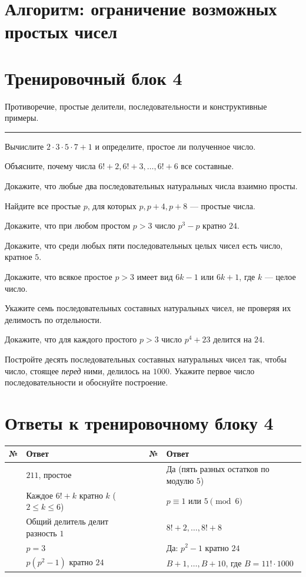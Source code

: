 \documentclass[11pt,a4paper]{article}
\newcommand{\task}[2]{\par\needspace{2\baselineskip}\noindent\makebox[8mm][l]{\color{navy}\bfseries #1.}#2\par\vspace{2mm}}
\newcommand{\training}[2]{\clearpage\section*{Тренировочный блок #1}\textcolor{muted}{#2}\par\vspace{3mm}\rule{\linewidth}{.4pt}\vspace{2mm}}
\newcommand{\answers}[2]{\clearpage\section*{Ответы к тренировочному блоку #1}\vspace{3mm}#2}
\newcommand{\anstable}[1]{\begin{center}\small\begin{tabularx}{\linewidth}{>{\centering\arraybackslash}p{9mm}X>{\centering\arraybackslash}p{9mm}X}\toprule\textbf{№}&\textbf{Ответ}&\textbf{№}&\textbf{Ответ}\\\midrule #1\\\bottomrule\end{tabularx}\end{center}}
\newcommand{\schemetitle}[1]{\clearpage\thispagestyle{fancy}\section*{Алгоритм: #1}\vspace{12mm}}
\begin{document}
\schemetitle{ограничение возможных простых чисел}
\begin{center}
\end{center}

\training{4}{Противоречие, простые делители, последовательности и конструктивные примеры.}
\task{1}{Вычислите $2\cdot3\cdot5\cdot7+1$ и определите, простое ли полученное число.}
\task{2}{Объясните, почему числа $6!+2,6!+3,\ldots,6!+6$ все составные.}
\task{3}{Докажите, что любые два последовательных натуральных числа взаимно просты.}
\task{4}{Найдите все простые $p$, для которых $p,p+4,p+8$ --- простые числа.}
\task{5}{Докажите, что при любом простом $p>3$ число $p^3-p$ кратно $24$.}
\task{6}{Докажите, что среди любых пяти последовательных целых чисел есть число, кратное $5$.}
\task{7}{Докажите, что всякое простое $p>3$ имеет вид $6k-1$ или $6k+1$, где $k$ --- целое число.}
\task{8}{Укажите семь последовательных составных натуральных чисел, не проверяя их делимость по отдельности.}
\task{9}{Докажите, что для каждого простого $p>3$ число $p^4+23$ делится на $24$.}
\task{10}{Постройте десять последовательных составных натуральных чисел так, чтобы число, стоящее \emph{перед} ними, делилось на $1000$. Укажите первое число последовательности и обоснуйте построение.}

\answers{4}{\anstable{
1&$211$, простое&6&Да (пять разных остатков по модулю $5$)\\
2&Каждое $6!+k$ кратно $k$ ($2\le k\le6$)&7&$p\equiv1$ или $5\pmod6$\\
3&Общий делитель делит разность $1$&8&$8!+2,\ldots,8!+8$\\
4&$p=3$&9&Да: $p^2-1$ кратно $24$\\
5&$p(p^2-1)$ кратно $24$&10&$B+1,\ldots,B+10$, где $B=11!\cdot1000$
}}
\end{document}
